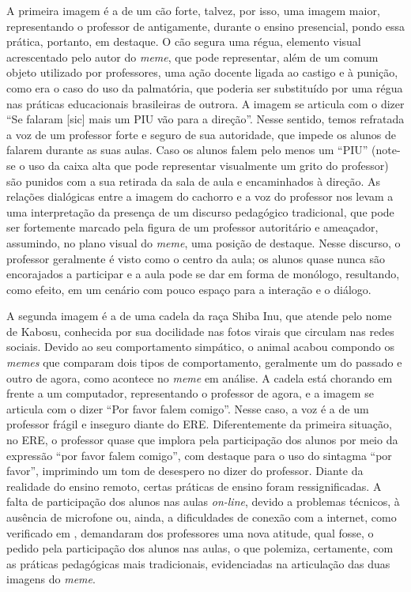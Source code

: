 \documentclass[portuguese]{textolivre}
\begin{document}
A primeira imagem é a de um cão forte, talvez, por isso, uma imagem maior, representando o professor de antigamente, durante o ensino presencial, pondo essa prática, portanto, em destaque. O cão segura uma régua, elemento visual acrescentado pelo autor do \textit{meme}, que pode representar, além de um comum objeto utilizado por professores, uma ação docente ligada ao castigo e à punição, como era o caso do uso da palmatória, que poderia ser substituído por uma régua nas práticas educacionais brasileiras de outrora. A imagem se articula com o dizer “Se falaram [sic] mais um PIU vão para a direção”. Nesse sentido, temos refratada a voz de um professor forte e seguro de sua autoridade, que impede os alunos de falarem durante as suas aulas. Caso os alunos falem pelo menos um “PIU” (note-se o uso da caixa alta que pode representar visualmente um grito do professor) são punidos com a sua retirada da sala de aula e encaminhados à direção. As relações dialógicas entre a imagem do cachorro e a voz do professor nos levam a uma interpretação da presença de um discurso pedagógico tradicional, que pode ser fortemente marcado pela figura de um professor autoritário e ameaçador, assumindo, no plano visual do \textit{meme}, uma posição de destaque. Nesse discurso, o professor geralmente é visto como o centro da aula; os alunos quase nunca são encorajados a participar e a aula pode se dar em forma de monólogo, resultando, como efeito, em um cenário com pouco espaço para a interação e o diálogo.
	
A segunda imagem é a de uma cadela da raça Shiba Inu, que atende pelo nome de Kabosu, conhecida por sua docilidade nas fotos virais que circulam nas redes sociais. Devido ao seu comportamento simpático, o animal acabou compondo os \textit{memes} que comparam dois tipos de comportamento, geralmente um do passado e outro de agora, como acontece no \textit{meme} em análise. A cadela está chorando em frente a um computador, representando o professor de agora, e a imagem se articula com o dizer “Por favor falem comigo”. Nesse caso, a voz é a de um professor frágil e inseguro diante do ERE. Diferentemente da primeira situação, no ERE, o professor quase que implora pela participação dos alunos por meio da expressão “por favor falem comigo”, com destaque para o uso do sintagma “por favor”, imprimindo um tom de desespero no dizer do professor. Diante da realidade do ensino remoto, certas práticas de ensino foram ressignificadas. A falta de participação dos alunos nas aulas \textit{on-line}, devido a problemas técnicos, à ausência de microfone ou, ainda, a dificuldades de conexão com a internet, como verificado em \textcite{bastos2021interacoes}, demandaram dos professores uma nova atitude, qual fosse, o pedido pela participação dos alunos nas aulas, o que polemiza, certamente, com as práticas pedagógicas mais tradicionais, evidenciadas na articulação das duas imagens do \textit{meme}.
	
\end{document}
